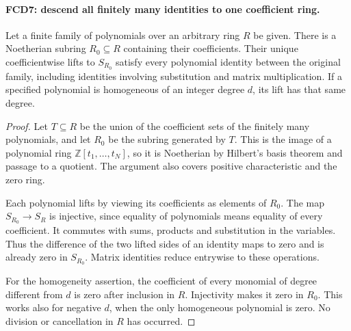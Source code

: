 \paragraph{FCD7: descend all finitely many identities to one coefficient ring.}
\label{claim:FCD7}
Let a finite family of polynomials over an arbitrary ring $R$ be given.
There is a Noetherian subring $R_0\subseteq R$ containing their
coefficients.  Their unique coefficientwise lifts to $S_{R_0}$
satisfy every polynomial identity between the original family,
including identities involving substitution and matrix multiplication.
If a specified polynomial is homogeneous of an integer degree $d$,
its lift has that same degree.

\begin{proof}
Let $T\subseteq R$ be the union of the coefficient sets of the
finitely many polynomials, and let $R_0$ be the subring generated
by $T$.  This is the image of a polynomial ring
$\mathbb Z[t_1,\ldots,t_N]$, so it is Noetherian by Hilbert's
basis theorem and passage to a quotient.  The argument also covers
positive characteristic and the zero ring.

Each polynomial lifts by viewing its coefficients as elements of
$R_0$.  The map $S_{R_0}\to S_R$ is injective, since equality
of polynomials means equality of every coefficient.  It commutes
with sums, products and substitution in the variables.  Thus the
difference of the two lifted sides of an identity maps to zero
and is already zero in $S_{R_0}$.  Matrix identities reduce
entrywise to these operations.

For the homogeneity assertion, the coefficient of every monomial
of degree different from $d$ is zero after inclusion in $R$.
Injectivity makes it zero in $R_0$.  This works also for negative
$d$, when the only homogeneous polynomial is zero.  No division
or cancellation in $R$ has occurred.
\end{proof}

